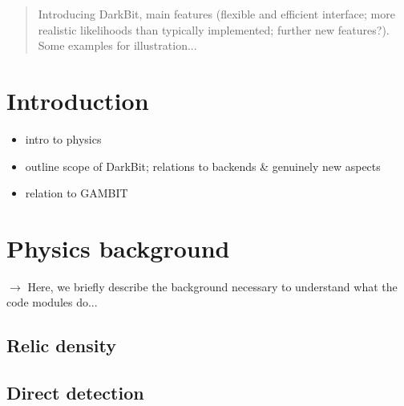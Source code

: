 \date{\today}


\maketitle

\begin{abstract}

Introducing DarkBit, main features (flexible and efficient interface; more realistic likelihoods
than typically implemented; further new features?). 
Some examples for illustration...

\end{abstract}

\section{Introduction}
\label{intro}

\begin{itemize}
\item intro to physics
\item outline scope of DarkBit; relations to backends \& genuinely new aspects
\item relation to GAMBIT
\end{itemize}


\section{Physics background}
\label{phys}

$\to$ Here, we briefly describe the background necessary to understand what the code modules do...

\subsection{Relic density}
\label{phys_rd}

\subsection{Direct detection}
\label{phys_dd}

